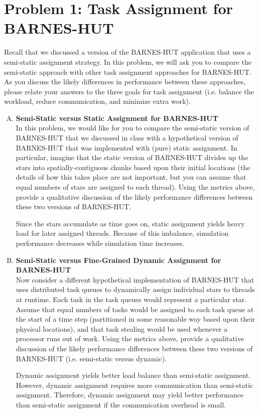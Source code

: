 \documentclass[11pt]{article}
\newenvironment{choice}{\begin{enumerate}[A.]}{\end{enumerate}}
\newenvironment{answer}{\begin{minipage}[c][1.5in]{\textwidth}}{\end{minipage}}
\begin{document}
\newpage
\section*{Problem 1: Task Assignment for BARNES-HUT}
Recall that we discussed a version of the BARNES-HUT application that uses a semi-static assignment strategy. In this problem, we will ask you to compare the semi-static approach with other task assignment approaches for BARNES-HUT. As you discuss the likely differences in performance between these approaches, please relate your answers to the three goals for task assignment (i.e. balance the workload, reduce communication, and minimize extra work).

\begin{choice}
\item \textbf{Semi-Static versus Static Assignment for BARNES-HUT}\\
In this problem, we would like for you to compare the semi-static version of BARNES-HUT that we discussed in class with a hypothetical version of BARNES-HUT that was implemented with (pure) static assignment. In particular, imagine that the static version of BARNES-HUT divides up the stars into spatially-contiguous chunks based upon their initial locations (the details of how this takes place are not important, but you can assume that equal numbers of stars are assigned to each thread). Using the metrics above, provide a qualitative discussion of the likely performance differences between these two versions of BARNES-HUT.

\begin{answer}
Since the stars accumulate as time goes on, static assignment yields heavy load for later assigned threads. Because of this imbalance, simulation performance decreases while simulation time increases.
\end{answer}

\item \textbf{Semi-Static versus Fine-Grained Dynamic Assignment for BARNES-HUT}\\
Now consider a different hypothetical implementation of BARNES-HUT that uses distributed task queues to dynamically assign individual stars to threads at runtime. Each task in the task queues would represent a particular star. Assume that equal numbers of tasks would be assigned to each task queue at the start of a time step (partitioned in some reasonable way based upon their physical locations), and that task stealing would be used whenever a processor runs out of work. Using the metrics above, provide a qualitative discussion of the likely performance differences between these two versions of BARNES-HUT (i.e. semi-static versus dynamic).

\begin{answer}
Dynamic assignment yields better load balance than semi-static assignment. However, dynamic assignment requires more communication than semi-static assignment. Therefore, dynamic assignment may yield better performance than semi-static assignment if the communication overhead is small.
\end{answer}
\end{choice}
\end{document}
